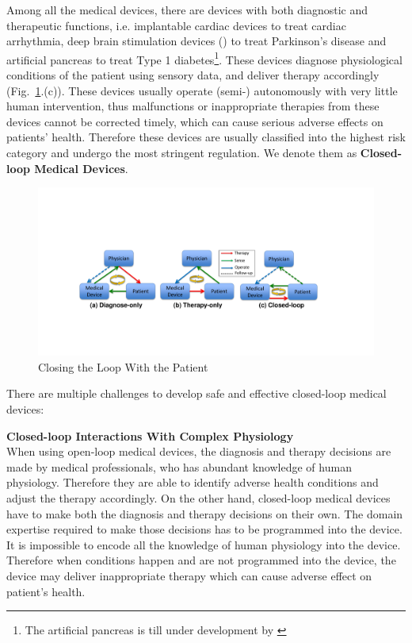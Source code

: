 \documentclass[a4paper]{article}
\newcommand{\figref}[1]{Fig.~\ref{fig:#1}}
\begin{document}
Among all the medical devices, there are devices with both diagnostic and therapeutic functions, i.e. implantable cardiac devices to treat cardiac arrhythmia, deep brain stimulation devices (\cite{Brain_sti}) to treat Parkinson's disease and artificial pancreas to treat Type 1 diabetes\footnote{The artificial pancreas is till under development by \cite{}}. These devices diagnose physiological conditions of the patient using sensory data, and deliver therapy accordingly (\figref{closed-loop}.(c)). These devices usually operate (semi-) autonomously with very little human intervention, thus malfunctions or inappropriate therapies from these devices cannot be corrected timely, which can cause serious adverse effects on patients' health. Therefore these devices are usually classified into the highest risk category and undergo the most stringent regulation. We denote them as \textbf{Closed-loop Medical Devices}. 
\begin{figure}[t]
		\centering
		\includegraphics[width=\textwidth]{figs/closed-loop.pdf}
		\caption{\small Closing the Loop With the Patient}
		\label{fig:closed-loop}
\end{figure}
There are multiple challenges to develop safe and effective closed-loop medical devices:

\textbf{Closed-loop Interactions With Complex Physiology}\\
When using open-loop medical devices, the diagnosis and therapy decisions are made by medical professionals, who has abundant knowledge of human physiology. Therefore they are able to identify adverse health conditions and adjust the therapy accordingly. On the other hand, closed-loop medical devices have to make both the diagnosis and therapy decisions on their own. The domain expertise required to make those decisions has to be programmed into the device. It is impossible to encode all the knowledge of human physiology into the device. Therefore when conditions happen and are not programmed into the device, the device may deliver inappropriate therapy which can cause adverse effect on patient's health. 
\end{document}
